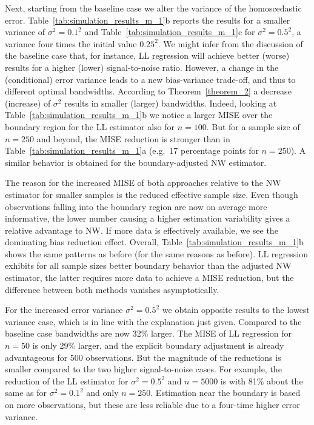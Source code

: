 Next, starting from the baseline case we alter the variance of the homoscedastic error.
Table~\ref{tab:simulation_results_m_1}b reports the results for a smaller variance of $\sigma^2 = 0.1^2$ and Table~\ref{tab:simulation_results_m_1}c for $\sigma^2 = 0.5^2$, a variance four times the initial value $0.25^2$.
We might infer from the discussion of the baseline case that, for instance,
LL regression will achieve better (worse) results for a higher (lower) signal-to-noise ratio.
However, a change in the (conditional) error variance leads to a new bias-variance trade-off, and thus to different optimal bandwidths.
According to Theorem~\ref{theorem_2} a decrease (increase) of $\sigma^2$ results in smaller (larger) bandwidths.
Indeed, looking at Table~\ref{tab:simulation_results_m_1}b we notice a larger MISE over the boundary region for the LL estimator also for $n = 100$.
But for a sample size of $n = 250$ and beyond, the MISE reduction is stronger than in Table~\ref{tab:simulation_results_m_1}a
(e.g.\ 17 percentage points for $n = 250$).
A similar behavior is obtained for the boundary-adjusted NW estimator.

The reason for the increased MISE of both approaches relative to the NW estimator for smaller samples is the reduced effective sample size.
Even though observations falling into the boundary region are now on average more informative,
the lower number causing a higher estimation variability gives a relative advantage to NW.
If more data is effectively available, we see the dominating bias reduction effect.
Overall, Table~\ref{tab:simulation_results_m_1}b shows the same patterns as before (for the same reasons as before).
LL regression exhibits for all sample sizes better boundary behavior than the adjusted NW estimator,
the latter requires more data to achieve a MISE reduction, but the difference between both methods vanishes asymptotically.

For the increased error variance $\sigma^2 = 0.5^2$ we obtain opposite results to the lowest variance case,
which is in line with the explanation just given.
Compared to the baseline case bandwidths are now 32\% larger.
The MISE of LL regression for $n = 50$ is only 29\% larger, and the explicit boundary adjustment is already advantageous for 500 observations.
But the magnitude of the reductions is smaller compared to the two higher signal-to-noise cases.
For example, the reduction of the LL estimator for $\sigma^2 = 0.5^2$ and $n = 5000$ is with 81\% about the same as for $\sigma^2 = 0.1^2$ and only $n = 250$.
Estimation near the boundary is based on more observations, but these are less reliable due to a four-time higher error variance.

